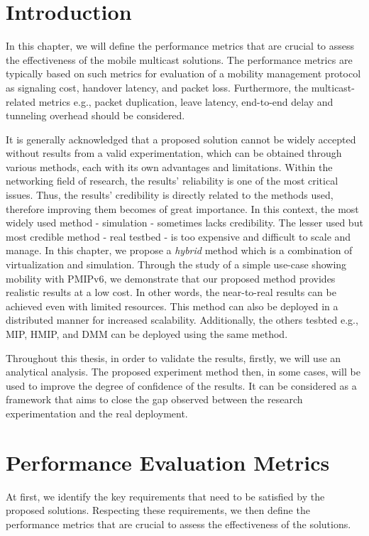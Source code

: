 \section{Introduction}
In this chapter, we will define the performance metrics that are crucial to assess the effectiveness of the mobile multicast solutions. The performance metrics are typically based on such metrics for evaluation of a mobility management protocol as signaling cost, handover latency, and packet loss. Furthermore, the multicast-related metrics e.g., packet duplication, leave latency, end-to-end delay and tunneling overhead should be considered.

It is generally acknowledged that a proposed solution cannot be widely accepted without results from a valid experimentation, which can be obtained through various methods, each with its own advantages and limitations. Within the networking field of research, the results’ reliability is one of the most critical issues. Thus, the results' credibility is directly related to the methods used, therefore improving them becomes of great importance. In this context, the most widely used method - simulation - sometimes lacks credibility. The lesser used but most credible method - real testbed - is too expensive and difficult to scale and manage. In this chapter, we propose a \textit{hybrid} method which is a combination of virtualization and simulation. Through the study of a simple use-case showing mobility with PMIPv6, we demonstrate that our proposed method provides realistic results at a low cost. In other words, the near-to-real results can be achieved even with limited resources.  This method can also be deployed in a distributed manner for increased scalability. Additionally, the others tesbted e.g., MIP, HMIP, and DMM can be deployed using the same method. 

Throughout this thesis, in order to validate the results, firstly, we will use an analytical analysis. The proposed experiment method then, in some cases, will be used to improve the degree of confidence of the results. It can be considered as a framework that aims to close the gap observed between the research experimentation and the real deployment.
 
\section{Performance Evaluation Metrics}
At first, we identify the key requirements that need to be satisfied by the proposed solutions. Respecting these requirements, we then define the performance metrics that are crucial to assess the effectiveness of the solutions.

